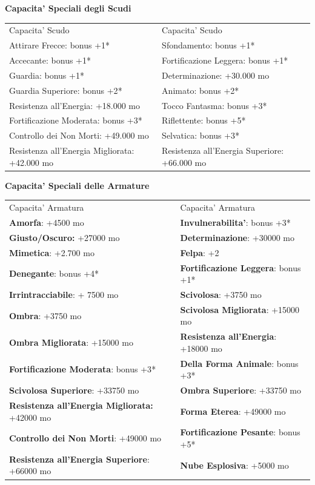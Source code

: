 \documentclass[a4paper,11pt,twoside,openany]{dndbook}
\begin{document}
{\bigskip

\textbf{Capacita' Speciali degli Scudi}

\bigskip

\begin{tabular}[c]{@{}ll@{}}
\toprule 
Capacita' Scudo & Capacita' Scudo\tabularnewline
Attirare Frecce: bonus +1{*} & Sfondamento: bonus +1{*}\tabularnewline
Accecante: bonus +1{*} & Fortificazione Leggera: bonus +1{*}\tabularnewline
Guardia: bonus +1{*} & Determinazione: +30.000 mo\tabularnewline
Guardia Superiore: bonus +2{*} & Animato: bonus +2{*}\tabularnewline
Resistenza all'Energia: +18.000 mo & Tocco Fantasma: bonus +3{*}\tabularnewline
Fortificazione Moderata: bonus +3{*} & Riflettente: bonus +5{*}\tabularnewline
Controllo dei Non Morti: +49.000 mo & Selvatica: bonus +3{*}\tabularnewline
Resistenza all'Energia Migliorata: +42.000 mo & Resistenza all'Energia Superiore: +66.000 mo\tabularnewline
\bottomrule
\end{tabular}

\bigskip

\textbf{Capacita' Speciali delle Armature}

\begin{tabular}[c]{@{}ll@{}}
\toprule 
Capacita' Armatura & Capacita' Armatura\tabularnewline
\textbf{Amorfa}:\index{Amorfa} +4500 mo & \textbf{Invulnerabilita'}\index{Invulnerabilita'}: bonus +3{*}\tabularnewline
\textbf{Giusto/Oscuro:}\index{Giusto/Oscuro:} +27000 mo & \textbf{Determinazione}\index{Determinazione}: +30000 mo\tabularnewline
\textbf{Mimetica}: \index{Mimetica}+2.700 mo & \textbf{Felpa}\index{Felpa}: +2\tabularnewline
\textbf{Denegante}:\index{Denegante} bonus +4{*} & \textbf{Fortificazione Leggera}\index{Fortificazione Leggera}: bonus +1{*}\tabularnewline
\textbf{Irrintracciabile}:\index{Irrintracciabile} + 7500 mo & \textbf{Scivolosa}\index{Scivolosa}: +3750 mo\tabularnewline
\textbf{Ombra}: \index{Ombra}+3750 mo & \textbf{Scivolosa Migliorata}\index{Scivolosa Migliorata}: +15000 mo\tabularnewline
\textbf{Ombra Migliorata}:\index{Ombra Migliorata} +15000 mo & \textbf{Resistenza all'Energia}: \index{Resistenza all'Energia}+18000 mo\tabularnewline
\textbf{Fortificazione Moderata}: \index{Fortificazione Moderata}bonus +3{*} & \textbf{Della Forma Animale}\index{Della Forma Animale}: bonus +3{*}\tabularnewline
\textbf{Scivolosa Superiore}:\index{Scivolosa Superiore} +33750 mo & \textbf{Ombra Superiore}: \index{Ombra Superiore}+33750 mo\tabularnewline
\textbf{Resistenza all'Energia Migliorata:} \index{Resistenza all'Energia Migliorata:}+42000 mo & \textbf{Forma Eterea}\index{Forma Eterea}: +49000 mo\tabularnewline
\textbf{Controllo dei Non Morti}:\index{Controllo dei Non Morti} +49000 mo & \textbf{Fortificazione Pesante}:\index{Fortificazione Pesante} bonus +5{*}\tabularnewline
\textbf{Resistenza all'Energia Superiore}\index{Resistenza all'Energia Superiore}: +66000 mo & \textbf{Nube Esplosiva}\index{Nube Esplosiva}: +5000 mo\tabularnewline
\bottomrule
\end{tabular}

}
\end{document}
